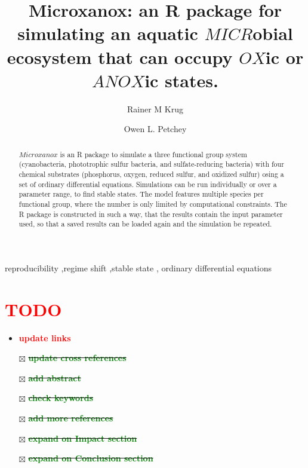 \documentclass[]{elsarticle} %
\providecommand{\tightlist}{%
  \setlength{\itemsep}{0pt}\setlength{\parskip}{0pt}}
\begin{document}
\begin{frontmatter}

  \title{Microxanox: an R package for simulating an aquatic
\(MICR\)obial ecosystem that can occupy \(OX\)ic or \(ANOX\)ic states.}
    \author[University of Zürich]{Rainer M Krug%
  }
    \author[University of Zürich]{Owen L. Petchey}
  
  \begin{abstract}
  \(Microxanox\) is an R package to simulate a three functional group
  system (cyanobacteria, phototrophic sulfur bacteria, and
  sulfate-reducing bacteria) with four chemical substrates (phosphorus,
  oxygen, reduced sulfur, and oxidized sulfur) osing a set of ordinary
  differential equations. Simulations can be run individually or over a
  parameter range, to find stable states. The model features multiple
  species per functional group, where the number is only limited by
  computational constraints. The R package is constructed in such a way,
  that the results contain the input parameter used, so that a saved
  results can be loaded again and the simulation be repeated.
  \end{abstract}
    \begin{keyword}
    reproducibility \sep regime shift \sep stable state \sep 
    ordinary differential equations
  \end{keyword}
  
 \end{frontmatter}

\hypertarget{section}{%
\section{\texorpdfstring{\textcolor{red}{TODO}}{}}\label{section}}

\begin{itemize}
\tightlist
\item
  \textbf{\textcolor{red}{update links}}
\item[$\boxtimes$]
  \sout{\textbf{\textcolor{green}{update cross references}}}
\item[$\boxtimes$]
  \sout{\textbf{\textcolor{green}{add abstract}}}
\item[$\boxtimes$]
  \sout{\textbf{\textcolor{green}{check keywords}}}
\item[$\boxtimes$]
  \sout{\textbf{\textcolor{green}{add more references}}}
\item[$\boxtimes$]
  \sout{\textbf{\textcolor{green}{expand on Impact section}}}
\item[$\boxtimes$]
  \sout{\textbf{\textcolor{green}{expand on Conclusion section}}}
  \pagebreak
\end{itemize}
\end{document}
